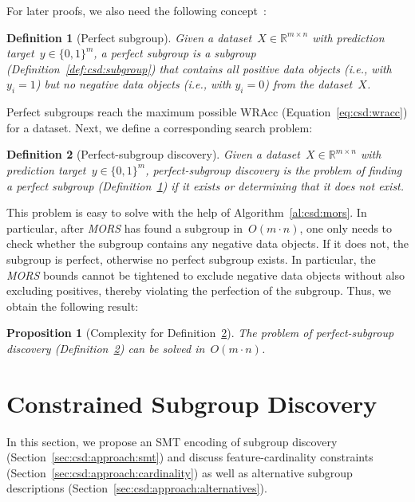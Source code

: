 \documentclass[acmsmall]{acmart} %
\theoremstyle{acmplain}
\newtheorem{proposition}{Proposition}
\theoremstyle{acmdefinition}
\newtheorem{definition}{Definition}
\begin{document}
For later proofs, we also need the following concept~\cite{meeng2014rocsearch}:
%
\begin{definition}[Perfect subgroup]
	Given a dataset~$X \in \mathbb{R}^{m \times n}$ with prediction target~$y \in \{0, 1\}^m$,
	a \emph{perfect subgroup} is a subgroup (Definition~\ref{def:csd:subgroup}) that contains all positive data objects (i.e., with $y_i = 1$) but no negative data objects (i.e., with $y_i = 0$) from the dataset~$X$.
	\label{def:csd:perfect-subgroup}
\end{definition}
%
Perfect subgroups reach the maximum possible WRAcc (Equation~\ref{eq:csd:wracc}) for a dataset.
Next, we define a corresponding search problem:
%
\begin{definition}[Perfect-subgroup discovery]
	Given a dataset~$X \in \mathbb{R}^{m \times n}$ with prediction target~$y \in \{0, 1\}^m$,
	\emph{perfect-subgroup discovery} is the problem of finding a perfect subgroup (Definition~\ref{def:csd:perfect-subgroup}) if it exists or determining that it does not exist.
	\label{def:csd:perfect-subgroup-discovery}
\end{definition}
%
This problem is easy to solve with the help of Algorithm~\ref{al:csd:mors}.
In particular, after \emph{MORS} has found a subgroup in~$O(m \cdot n)$, one only needs to check whether the subgroup contains any negative data objects.
If it does not, the subgroup is perfect, otherwise no perfect subgroup exists.
In particular, the \emph{MORS} bounds cannot be tightened to exclude negative data objects without also excluding positives, thereby violating the perfection of the subgroup.
Thus, we obtain the following result: 
%
\begin{proposition}[Complexity for Definition~\ref{def:csd:perfect-subgroup-discovery}]
	The problem of perfect-subgroup discovery (Definition~\ref{def:csd:perfect-subgroup-discovery}) can be solved in~$O(m \cdot n)$.
	\label{prop:csd:complexity-unconstrained-perfect-subgroup}
\end{proposition}

\section{Constrained Subgroup Discovery}
\label{sec:csd:approach}

In this section, we propose an SMT encoding of subgroup discovery (Section~\ref{sec:csd:approach:smt}) and discuss feature-cardinality constraints (Section~\ref{sec:csd:approach:cardinality}) as well as alternative subgroup descriptions (Section~\ref{sec:csd:approach:alternatives}).
\end{document}
